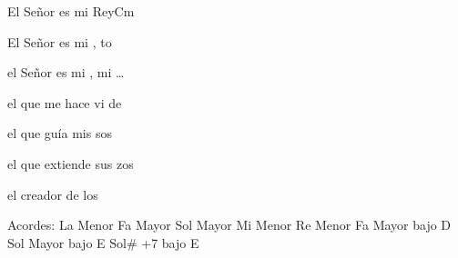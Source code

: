 \documentclass[12pt, spanish]{book}
\begin{document}
\begin{song}{El Señor es mi Rey}{Cm}
\begin{SBExtraKeys}
{            \begin{SBOpGroup}
                El Señor es mi ,  to

                el Señor es mi , mi \ldots

                el que me hace vi de 

                el que guía mis sos

                el que extiende sus zos

                el creador de los 
            \end{SBOpGroup}


            \ifChordBk
            \begin{SBOpGroup}
                Acordes:\break
                \upchord{\Am}\qquad La Menor \hfill
                \upchord{\F}\qquad Fa Mayor \hfill\null\break
                \upchord{\G}\qquad Sol Mayor \hfill
                \upchord{\Em}\qquad Mi Menor \hfill\null\break
                \upchord{\Dm}\qquad Re Menor \hfill
                \upchord{\FD}\qquad Fa Mayor bajo D \hfill\null\break
                \upchord{\GE}\qquad Sol Mayor bajo E \hfill
                \upchord{\GsmajsevenE}\qquad Sol\# +7 bajo E \hfill\null\break
            \end{SBOpGroup}
            \fi
        }\end{SBExtraKeys}
    \end{song}
\end{document}
